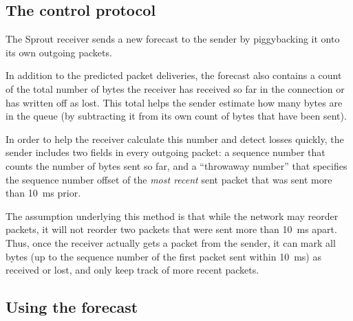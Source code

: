 \subsection{The control protocol}

The Sprout receiver sends a new forecast to the sender by piggybacking
it onto its own outgoing packets.

In addition to the predicted packet deliveries, the forecast also
contains a count of the total number of bytes the receiver has
received so far in the connection or has written off as lost. This
total helps the sender estimate how many bytes are in the queue (by
subtracting it from its own count of bytes that have been sent).

In order to help the receiver calculate this number and detect losses
quickly, the sender includes two fields in every outgoing packet: a
sequence number that counts the number of bytes sent so far, and a
``throwaway number'' that specifies the sequence number offset of the
\emph{most recent} sent packet that was sent more than 10~ms prior.

The assumption underlying this method is that while the network may
reorder packets, it will not reorder two packets that were sent more
than 10~ms apart. Thus, once the receiver actually gets a packet from
the sender, it can mark all bytes (up to the sequence number of the
first packet sent within 10~ms) as received or lost, and only keep
track of more recent packets.

\subsection{Using the forecast}


